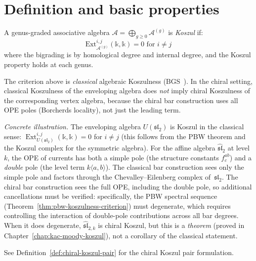 \section{Definition and basic properties}

\begin{definition}
A genus-graded associative algebra $\mathcal{A} = \bigoplus_{g \geq 0} \mathcal{A}^{(g)}$ is \emph{Koszul} if:
\[\text{Ext}_{\mathcal{A}^{(g)}}^{i,j}(\mathbb{k}, \mathbb{k}) = 0 \text{ for } i \neq j\]
where the bigrading is by homological degree and internal degree, and the Koszul property holds at each genus.
\end{definition}

\begin{remark}\label{rem:classical-vs-chiral-koszulness}
The criterion above is \emph{classical} algebraic Koszulness
(BGS~\cite{BGS96}). In the chiral setting, classical Koszulness of
the enveloping algebra does \emph{not} imply chiral Koszulness of the
corresponding vertex algebra, because the chiral bar construction
uses all OPE poles (Borcherds locality), not just the leading term.

\emph{Concrete illustration.}
The enveloping algebra $U(\mathfrak{sl}_2)$ is Koszul in the classical
sense: $\operatorname{Ext}^{i,j}_{U(\mathfrak{sl}_2)}(\mathbb{k},
\mathbb{k}) = 0$ for $i \neq j$ (this follows from the PBW theorem
and the Koszul complex for the symmetric algebra). For the affine
algebra $\widehat{\mathfrak{sl}}_2$ at level~$k$, the OPE of
currents has both a simple pole (the structure constants $f^{ab}_c$)
and a \emph{double} pole (the level term $k\langle a, b\rangle$).
The classical bar construction sees only the simple pole and factors
through the Chevalley--Eilenberg complex of~$\mathfrak{sl}_2$. The
chiral bar construction sees the full OPE, including the double pole,
so additional cancellations must be verified: specifically, the PBW
spectral sequence (Theorem~\ref{thm:pbw-koszulness-criterion}) must
degenerate, which requires controlling the interaction of double-pole
contributions across all bar degrees. When it does degenerate,
$\widehat{\mathfrak{sl}}_{2,k}$ is chiral Koszul, but this is a
\emph{theorem} (proved in Chapter~\ref{chap:kac-moody-koszul}), not a
corollary of the classical statement.

See Definition~\ref{def:chiral-koszul-pair} for the chiral Koszul pair
formulation.
\end{remark}

